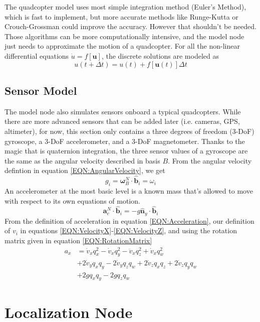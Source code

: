 \documentclass[lettersize,journal]{IEEEtran}
\begin{document}
The quadcopter model uses most simple integration method (Euler's Method), which is fast to implement, but more accurate methods like Runge-Kutta or Crouch-Grossman could improve the accuracy.
However that shouldn't be needed.
Those algorithms can be more computationally intensive, and the model node just needs to approximate the motion of a quadcopter.
For all the non-linear differential equations $\dot{u}=f\left[\mathbf{u}\right]$, the discrete solutions are modeled as
\begin{equation}
  u\left(t+\Delta t\right) = u\left(t\right) + f\left[\mathbf{u}\left(t\right)\right]\Delta t
\end{equation}
\subsection{Sensor Model}
The model node also simulates sensors onboard a typical quadcopters.
While there are more advanced sensors that can be added later (i.e. cameras, GPS, altimeter), for now, this section only contains a three degrees of freedom (3-DoF) gyroscope, a 3-DoF accelerometer, and a 3-DoF magnetometer.
Thanks to the magic that is quaternion integration, the three sensor values of a gyroscope are the same as the angular velocity described in basis $B$.
From the angular velocity defintion in equation \ref{EQN:AngularVelocity}, we get
\begin{equation}
  g_i = \boldsymbol\omega^N_B \cdot \mathbf{\hat{b}}_i = \omega_i
\end{equation}
An accelerometer at the most basic level is a known mass that's allowed to move with respect to its own equations of motion.
\begin{equation}
  \mathbf{a}^N_c\cdot \mathbf{\hat{b}}_i=-g\mathbf{\hat{n}}_y\cdot\mathbf{\hat{b}}_i
\end{equation}
From the definition of acceleration in equation \ref{EQN:Acceleration}, our definition of $v_i$ in equations \ref{EQN:VelocityX}-\ref{EQN:VelocityZ},  and using the rotation matrix given in equation \ref{EQN:RotationMatrix}
\begin{align}
  a_x &= \dot{v}_xq_x^2-\dot{v}_xq_y^2-\ddot{v}_xq_z^2+\dot{v}_xq_w^2\nonumber\\
  &+2\dot{v}_yq_xq_y-2\dot{v}_yq_zq_w+ 2\dot{v}_z q_xq_z+2\dot{v}_zq_yq_w \nonumber\\
  &+2gq_xq_y-2gq_zq_w
\end{align}



\section{Localization Node}
\end{document}
